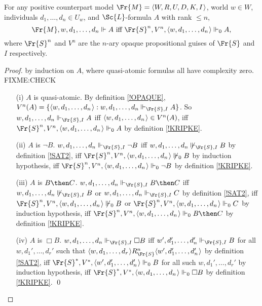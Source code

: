 \documentclass[11pt]{woarticle}
\theoremstyle{break}
\theoremstyle{nonumberplain}
\newcommand{\SAT}{\Vdash}
\newcommand{\1}{\;\,|\;\,}
\renewcommand{\t}[1]{\ensuremath{\langle #1  \makebox[.2ex]{}\rangle}}
\begin{document}
\begin{lemma}\label{opaque}
  For any positive counterpart model $\Fr{M}=\t{W,R,U,D,K,I}$, world $w \in W$,
  individuals $d_1,\ldots,d_n \in U_w$, and $\Sc{L}$-formula $A$ with rank
  $\leq n$,
  \[
    \Fr{M},w,d_1,\ldots,d_n \SAT A \text{ iff
    } \Fr{S}^n,V^n,\t{w,d_1,\ldots,d_n} \SAT_0 A,
  \]
  where $\Fr{S}^n$ and $V^n$ are the $n$-ary opaque propositional
  guises of $\Fr{S}$ and $I$ respectively.
\end{lemma}

\begin{proof} by induction on $A$, where quasi-atomic formulas all
  have complexity zero.
  FIXME:CHECK
  \begin{itemize}
  \item[(i)] $A$ is quasi-atomic. By definition \ref{!OPAQUE}, $V^n(A)
    = \{ \t{w,d_1,\ldots,d_n} : w,d_1,\ldots,d_n \SAT_{\Fr{S},I} A
    \}$. So $w,d_1,\ldots,d_n \SAT_{\Fr{S},I} A$ iff
    $\t{w,d_1,\ldots,d_n} \in V^n(A)$, iff
    $\Fr{S}^n,V^n,\t{w,d_1,\ldots,d_n} \SAT_0 A$ by definition
    \ref{!KRIPKE}.
  \item[(ii)] $A$ is $\neg B$. $w,d_1,\ldots,d_n \SAT_{\Fr{S},I} \neg
    B$ iff $w,d_1,\ldots,d_n \not\SAT_{\Fr{S},I} B$ by definition
    \ref{!SAT2}, iff $\Fr{S}^n,V^n,\t{w,d_1,\ldots,d_n} \not\SAT_0 B$
    by induction hypothesis, iff $\Fr{S}^n,V^n,\t{w,d_1,\ldots,d_n}
    \SAT_0\neg B$ by definition \ref{!KRIPKE}.
  \item[(iii)] $A$ is $B \then C$. $w,d_1,\ldots,d_n \SAT_{\Fr{S},I} B
    \then C$ iff $w,d_1,\ldots,d_n \not\SAT_{\Fr{S},I} B$ or
    $w,d_1,\ldots,d_n \SAT_{\Fr{S},I} C$ by definition \ref{!SAT2},
    iff $\Fr{S}^n,V^n,\t{w,d_1,\ldots,d_n} \not\SAT_0 B$ or
    $\Fr{S}^n,V^n,\t{w,d_1,\ldots,d_n} \SAT_0 C$ by induction
    hypothesis, iff $\Fr{S}^n,V^n,\t{w,d_1,\ldots,d_n} \SAT_0 B\then
    C$ by definition \ref{!KRIPKE}.
  \item[(iv)] $A$ is $\Box B$. $w,d_1,\ldots,d_n \SAT_{\Fr{S},I} \Box
    B$ iff $w',d_1',\ldots,d_n' \SAT_{\Fr{S},I} B$ for all
    $w,d_1',\ldots,d_r'$ such that $\t{w,d_1,\ldots,d_r} R^n_{\Fr{S}}
    \t{w',d_1',\ldots,d_n'}$ by definition \ref{!SAT2}, iff
    $\Fr{S}^*,V^*,\t{w',d_1',\ldots,d_n'} \SAT_0 B$ for all such
    $w,d_1',\ldots,d_r'$ by induction hypothesis, iff
    $\Fr{S}^*,V^*,\t{w,d_1,\ldots,d_n} \SAT_0 \Box B$ by definition
    \ref{!KRIPKE}. \qed
  \end{itemize}
\end{proof}
\end{document}
